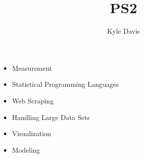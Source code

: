 \documentclass{article}
\title{PS2}
\author{Kyle Davis}
\begin{document}
\maketitle


\begin{itemize}
\item Measurement
\item Statistical Programming Languages
\item Web Scraping
\item Handling Large Data Sets
\item Visualization
\item Modeling
\end{itemize}
\end{document}
